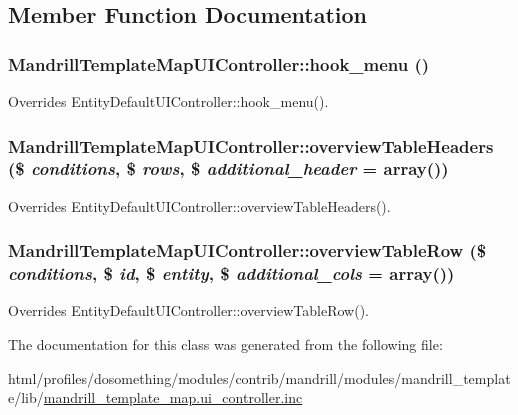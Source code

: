 \subsection{Member Function Documentation}
\hypertarget{classMandrillTemplateMapUIController_a2a8247480b6adee6a713f059dcda0f3c}{
\subsubsection[{hook\_\-menu}]{\setlength{\rightskip}{0pt plus 5cm}MandrillTemplateMapUIController::hook\_\-menu ()}}
\label{classMandrillTemplateMapUIController_a2a8247480b6adee6a713f059dcda0f3c}
Overrides EntityDefaultUIController::hook\_\-menu(). \hypertarget{classMandrillTemplateMapUIController_af04e2a9195b76ab516f8087a4408052b}{
\subsubsection[{overviewTableHeaders}]{\setlength{\rightskip}{0pt plus 5cm}MandrillTemplateMapUIController::overviewTableHeaders (\$ {\em conditions}, \/  \$ {\em rows}, \/  \$ {\em additional\_\-header} = {\ttfamily array()})}}
\label{classMandrillTemplateMapUIController_af04e2a9195b76ab516f8087a4408052b}
Overrides EntityDefaultUIController::overviewTableHeaders(). \hypertarget{classMandrillTemplateMapUIController_a4f326c7f1cc320a2c4d237df4f05a326}{
\subsubsection[{overviewTableRow}]{\setlength{\rightskip}{0pt plus 5cm}MandrillTemplateMapUIController::overviewTableRow (\$ {\em conditions}, \/  \$ {\em id}, \/  \$ {\em entity}, \/  \$ {\em additional\_\-cols} = {\ttfamily array()})}}
\label{classMandrillTemplateMapUIController_a4f326c7f1cc320a2c4d237df4f05a326}
Overrides EntityDefaultUIController::overviewTableRow(). 

The documentation for this class was generated from the following file:\begin{DoxyCompactItemize}
\item 
html/profiles/dosomething/modules/contrib/mandrill/modules/mandrill\_\-template/lib/\hyperlink{mandrill__template__map_8ui__controller_8inc}{mandrill\_\-template\_\-map.ui\_\-controller.inc}\end{DoxyCompactItemize}

